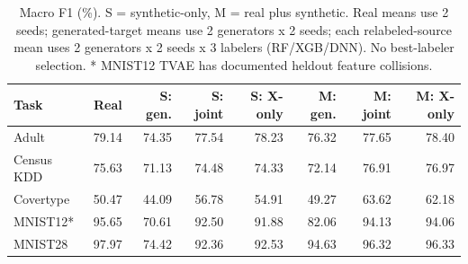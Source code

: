 \begin{table}[t]
\centering
{\small
\begin{tabular}{lrrrrrrr}
\toprule
Task & Real & S: gen. & S: joint & S: X-only & M: gen. & M: joint & M: X-only \\
\midrule
Adult & 79.14 & 74.35 & 77.54 & 78.23 & 76.32 & 77.65 & 78.40 \\
Census KDD & 75.63 & 71.13 & 74.48 & 74.33 & 72.14 & 76.91 & 76.97 \\
Covertype & 50.47 & 44.09 & 56.78 & 54.91 & 49.27 & 63.62 & 62.18 \\
MNIST12* & 95.65 & 70.61 & 92.50 & 91.88 & 82.06 & 94.13 & 94.06 \\
MNIST28 & 97.97 & 74.42 & 92.36 & 92.53 & 94.63 & 96.32 & 96.33 \\
\bottomrule
\end{tabular}
}
\caption{Macro F1 (\%). S = synthetic-only, M = real plus synthetic. Real means use 2 seeds; generated-target means use 2 generators x 2 seeds; each relabeled-source mean uses 2 generators x 2 seeds x 3 labelers (RF/XGB/DNN). No best-labeler selection. * MNIST12 TVAE has documented heldout feature collisions.}
\label{tab:classification}
\end{table}
